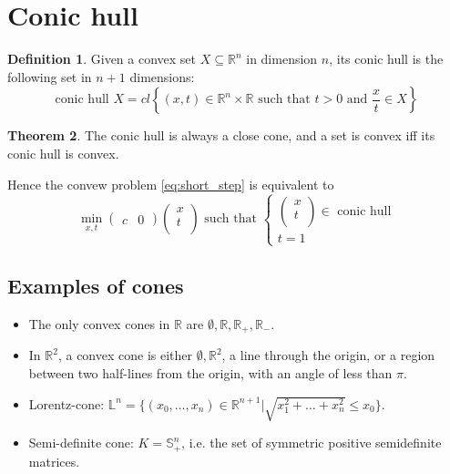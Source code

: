 \documentclass[12pt, openany]{report}
\newcommand{\R}{\mathbb{R}}
\theoremstyle{definition}
\newtheorem{thm}{Theorem}[chapter]
\newtheorem{definition}[thm]{Definition}
\begin{document}
\section{Conic hull}
\begin{definition}
    Given a convex set $X\subseteq \R^n$ in dimension $n$, its conic hull is the following set in $n+1$ dimensions:
    \begin{equation}
        \text{conic hull }X = cl\left\{(x,t)\in \R^n\times \R \text{ such that } t>0 \text{ and }\frac{x}{t}\in X\right\}
    \end{equation}
\end{definition}
\begin{thm}
    The conic hull is always a close cone, and a set is convex iff its conic hull is convex.
\end{thm}
Hence the convew problem \eqref{eq:short_step} is equivalent to 
\begin{equation}
    \min_{x,t} \begin{pmatrix}
        c & 0
    \end{pmatrix}\begin{pmatrix}
        x\\t \\
    \end{pmatrix} \text{ such that }
    \begin{cases}
        \begin{pmatrix} x \\t\\ \end{pmatrix}
        \in \text{ conic hull}\\
        t = 1    
    \end{cases}
\end{equation}
\subsection{Examples of cones}
\begin{itemize}
    \item The only convex cones in $\R$ are $\emptyset, \R,\R_+,\R_-$. 
    \item In $\R^2$, a convex cone is either $\emptyset, \R^2$, a line through the origin, or a region between two half-lines from the origin, with an angle of less than $\pi$. 
    \item Lorentz-cone: $\mathbb{L}^n = \{(x_0,\dots,x_n)\in \R^{n+1}|\sqrt{x_1^2+\dots+x_n^2}\le x_0\}$. 
    \item Semi-definite cone: $K=\mathbb{S}_+^n$, i.e. the set of symmetric positive semidefinite matrices. 
\end{itemize}
\end{document}
